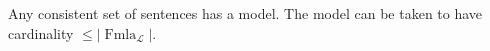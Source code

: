 Any consistent set of sentences has a model. The model can be taken to have cardinality $\leq |\operatorname{Fmla}_{\mathcal{L}}|$.
